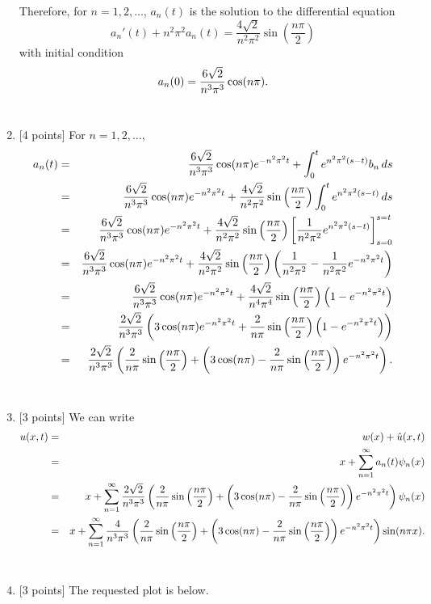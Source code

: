 \begin{solution}
\begin{enumerate}
Therefore, for $n=1,2,\ldots$, $a_n(t)$ is the solution to the differential equation
\[
a_n'(t)+n^2\pi^2 a_n(t)=\frac{4\sqrt{2}}{n^2\pi^2}\sin\left(\frac{n\pi}{2}\right)
\]
with initial condition
\[
a_n(0)={6\sqrt{2} \over n^3\pi^3}\cos(n\pi).
\]
\\
\item {[4 points]} For $n=1,2,\ldots$,
\begin{eqnarray*}
a_n(t)&=&{6\sqrt{2} \over n^3\pi^3}\cos(n\pi) e^{-n^2\pi^2t}+\int_0^te^{n^2\pi^2\left(s-t\right)}b_n\,ds
\\
&=&{6\sqrt{2} \over n^3\pi^3}\cos(n\pi) e^{-n^2\pi^2t}+\frac{4\sqrt{2}}{n^2\pi^2}\sin\left(\frac{n\pi}{2}\right)\int_0^te^{n^2\pi^2\left(s-t\right)}\,ds
\\
&=&{6\sqrt{2} \over n^3\pi^3}\cos(n\pi) e^{-n^2\pi^2t}+\frac{4\sqrt{2}}{n^2\pi^2}\sin\left(\frac{n\pi}{2}\right)\left[\frac{1}{n^2\pi^2}e^{n^2\pi^2\left(s-t\right)}\right]_{s=0}^{s=t}
\\
&=&{6\sqrt{2} \over n^3\pi^3}\cos(n\pi) e^{-n^2\pi^2t}+\frac{4\sqrt{2}}{n^2\pi^2}\sin\left(\frac{n\pi}{2}\right)\left(\frac{1}{n^2\pi^2}-\frac{1}{n^2\pi^2}e^{-n^2\pi^2t}\right)
\\
&=&{6\sqrt{2} \over n^3\pi^3}\cos(n\pi) e^{-n^2\pi^2t}+\frac{4\sqrt{2}}{n^4\pi^4}\sin\left(\frac{n\pi}{2}\right)\left(1-e^{-n^2\pi^2t}\right)
\\
&=&{2\sqrt{2} \over n^3\pi^3}\left(3\cos(n\pi) e^{-n^2\pi^2t}+\frac{2}{n\pi}\sin\left(\frac{n\pi}{2}\right)\left(1-e^{-n^2\pi^2t}\right)\right)
\\
&=&{2\sqrt{2} \over n^3\pi^3}\left(\frac{2}{n\pi}\sin\left(\frac{n\pi}{2}\right)+\left(3\cos(n\pi)-\frac{2}{n\pi}\sin\left(\frac{n\pi}{2}\right)\right) e^{-n^2\pi^2t}\right).
\end{eqnarray*}
\\
\item {[3 points]} We can write
\begin{eqnarray*}
u(x,t) &=& w(x)+\hat{u}(x,t)
\\
&=& x+\sum_{n=1}^\infty a_n(t) \psi_n(x)
\\
&=& x+\sum_{n=1}^\infty {2\sqrt{2} \over n^3\pi^3}\left(\frac{2}{n\pi}\sin\left(\frac{n\pi}{2}\right)+\left(3\cos(n\pi)-\frac{2}{n\pi}\sin\left(\frac{n\pi}{2}\right)\right) e^{-n^2\pi^2t}\right) \psi_n(x)
\\
&=& x+\sum_{n=1}^\infty {4 \over n^3\pi^3}\left(\frac{2}{n\pi}\sin\left(\frac{n\pi}{2}\right)+\left(3\cos(n\pi)-\frac{2}{n\pi}\sin\left(\frac{n\pi}{2}\right)\right)e^{-n^2\pi^2t}\right)\sin(n\pi x).
\end{eqnarray*}
\\
\item {[3 points]} The requested plot is below.


\end{enumerate}
\end{solution}

